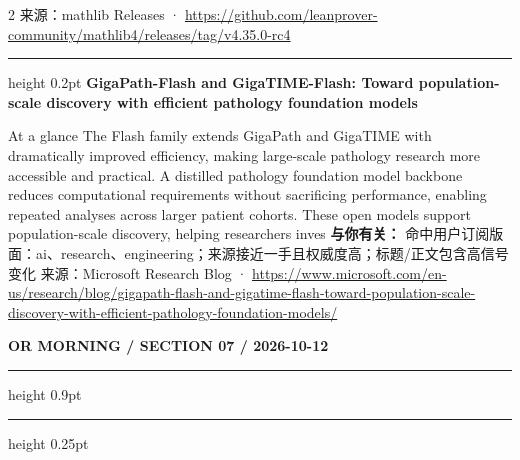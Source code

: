 \documentclass[10.5pt]{ctexart}
\begin{document}
\begin{multicols}{2}
{\footnotesize\color{ormuted} 来源：mathlib Releases · \url{https://github.com/leanprover-community/mathlib4/releases/tag/v4.35.0-rc4}}
\vspace{2mm}
\hrule height 0.2pt
\vspace{2mm}
{\large\bfseries GigaPath-Flash and GigaTIME-Flash: Toward population-scale discovery with efficient pathology foundation models}\par
At a glance The Flash family extends GigaPath and GigaTIME with dramatically improved efficiency, making large-scale pathology research more accessible and practical. A distilled pathology foundation model backbone reduces computational requirements without sacrificing performance, enabling repeated analyses across larger patient cohorts. These open models support population-scale discovery, helping researchers inves
\textbf{与你有关：} 命中用户订阅版面：ai、research、engineering；来源接近一手且权威度高；标题/正文包含高信号变化
{\footnotesize\color{ormuted} 来源：Microsoft Research Blog · \url{https://www.microsoft.com/en-us/research/blog/gigapath-flash-and-gigatime-flash-toward-population-scale-discovery-with-efficient-pathology-foundation-models/}}
\end{multicols}
\newpage
{\small\bfseries OR MORNING / SECTION 07 / 2026-10-12}
\vspace{2mm}
\hrule height 0.9pt
\vspace{1.5mm}
\hrule height 0.25pt
\vspace{4mm}
\end{document}
